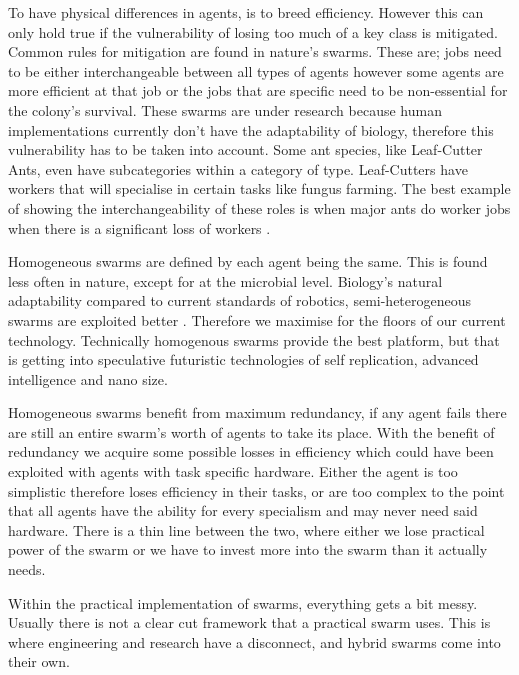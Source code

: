 \documentclass{UoYCSproject}
\begin{document}
To have physical differences in agents, is to breed efficiency.
However this can only hold true if the vulnerability of losing too much of a key class is mitigated.
Common rules for mitigation are found in nature's swarms.
These are; jobs need to be either interchangeable between all types of agents however some agents are more efficient at that job \cite{Ant communication} or the jobs that are specific need to be non-essential for the colony's survival.
These swarms are under research because human implementations currently don’t have the adaptability of biology, therefore this vulnerability has to be taken into account.
Some ant species, like Leaf-Cutter Ants, even have subcategories within a category of type.
Leaf-Cutters have workers that will specialise in certain tasks like fungus farming.
The best example of showing the interchangeability of these roles is when major ants do worker jobs when there is a significant loss of workers \cite{Swarm intellegiegence}.

Homogeneous swarms are defined by each agent being the same.
This is found less often in nature, except for at the microbial level.
Biology's natural adaptability compared to current standards of robotics, semi-heterogeneous swarms are exploited better \cite{Swarm robotics reviewed, Swarm intellegiegence}.
Therefore we maximise for the floors of our current technology. 
Technically homogenous swarms provide the best platform, but that is getting into speculative futuristic technologies of self replication, advanced intelligence and nano size.

Homogeneous swarms benefit from maximum redundancy, if any agent fails there are still an entire swarm's worth of agents to take its place.
With the benefit of redundancy we acquire some possible losses in efficiency which could have been exploited with agents with task specific hardware.
Either the agent is too simplistic therefore loses efficiency in their tasks, or are too complex to the point that all agents have the ability for every specialism and may never need said hardware.
There is a thin line between the two, where either we lose practical power of the swarm or we have to invest more into the swarm than it actually needs.

Within the practical implementation of swarms, everything gets a bit messy.
Usually there is not a clear cut framework that a practical swarm uses.
This is where engineering and research have a disconnect, and hybrid swarms come into their own.
\end{document}
